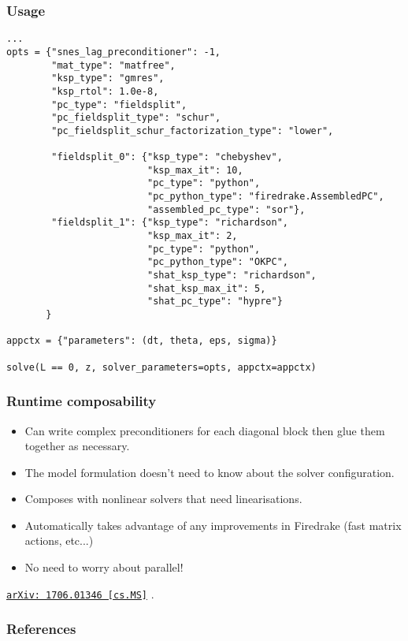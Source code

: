 \documentclass[presentation]{beamer}
\newcommand{\arxivlink}[2]{%
  \href{http://www.arxiv.org/abs/#1}%
  {{\small\texttt{arXiv:\,#1\,[#2]}}}%
}
\begin{document}
\begin{frame}[fragile]
  \frametitle{Usage}
\begin{verbatim}
...
opts = {"snes_lag_preconditioner": -1,
        "mat_type": "matfree",
        "ksp_type": "gmres",
        "ksp_rtol": 1.0e-8,
        "pc_type": "fieldsplit",
        "pc_fieldsplit_type": "schur",
        "pc_fieldsplit_schur_factorization_type": "lower",

        "fieldsplit_0": {"ksp_type": "chebyshev",
                         "ksp_max_it": 10,
                         "pc_type": "python",
                         "pc_python_type": "firedrake.AssembledPC",
                         "assembled_pc_type": "sor"},
        "fieldsplit_1": {"ksp_type": "richardson",
                         "ksp_max_it": 2,
                         "pc_type": "python",
                         "pc_python_type": "OKPC",
                         "shat_ksp_type": "richardson",
                         "shat_ksp_max_it": 5,
                         "shat_pc_type": "hypre"}
       }

appctx = {"parameters": (dt, theta, eps, sigma)}

solve(L == 0, z, solver_parameters=opts, appctx=appctx)
\end{verbatim}
\end{frame}

\begin{frame}
  \frametitle{Runtime composability}

  \begin{itemize}
  \item Can write complex preconditioners for each diagonal block then
    glue them together as necessary.

  \item The model formulation doesn't need to know about the solver
    configuration.

  \item Composes with nonlinear solvers that need linearisations.

  \item Automatically takes advantage of any improvements in Firedrake
    (fast matrix actions, etc...)

  \item No need to worry about parallel!
  \end{itemize}

  \textcite{Kirby:2017} \arxivlink{1706.01346}{cs.MS}.
\end{frame}


\appendix
\begin{frame}
  \frametitle{References}
  \printbibliography[heading=none]
\end{frame}
\end{document}
